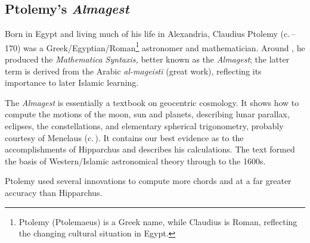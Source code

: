
\clearpage


\subsection{Ptolemy's \emph{Almagest}}

Born in Egypt and living much of his life in Alexandria, Claudius Ptolemy (c.\,--170) was a Greek/Egyptian/Roman\footnote{Ptolemy (Ptolemaeus) is a Greek name, while Claudius is Roman, reflecting the changing cultural situation in Egypt.} astronomer and mathematician. Around , he produced the \emph{Mathematica Syntaxis,} better known as the \emph{Almagest}; the latter term is derived from the Arabic \emph{al-mageisti} (great work), reflecting its importance to later Islamic learning.\par
 
The \emph{Almagest} is essentially a textbook on geocentric cosmology. It shows how to compute the motions of the moon, sun and planets, describing lunar parallax, eclipses, the constellations, and elementary spherical trigonometry, probably courtesy of Menelaus (c.\,). It contains our best evidence as to the accomplishments of Hipparchus and describes his calculations. The text formed the basis of Western/Islamic astronomical theory through to the 1600s.\par




Ptolemy used several innovations to compute more chords and at a far greater accuracy than Hipparchus.

